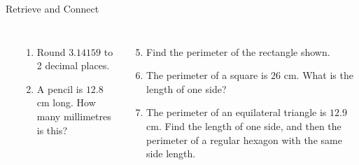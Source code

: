 \documentclass{beamer}
\newcommand{\ablank}[1]{%
  \alt<2>{\textcolor{red}{#1}}{\underline{\phantom{#1}}}%
}
\newcommand{\ashow}[1]{\uncover<2->{\textcolor{red}{\small #1}}}
\newcommand{\ashowq}[1]{\alt<2->{\textcolor{red}{\small #1}}{?}}
\begin{document}
\begin{frame}{Retrieve and Connect}
\hypertarget{q-st1}{}

\begin{columns}

\begin{center}
\end{center}

\small
\begin{enumerate}
  \item Round $3.14159$ to 2 decimal places. \ashow{3.14}
  \item A pencil is $12.8$ cm long. How many millimetres is this? \ablank{128 mm}
\end{enumerate}

\begin{enumerate}
  \setcounter{enumi}{4}
  \item Find the perimeter of the rectangle shown. \ashow{25.4 cm}
  \item The perimeter of a square is $26$ cm. What is the length of one side? \ashow{6.5 cm}
  \item  The perimeter of an equilateral triangle is $12.9$ cm. 
    Find the length of one side, and then the perimeter of a regular hexagon with the same side length. \ashow{$4.3$ cm; hexagon: $25.8$ cm}
\end{enumerate}

\end{columns}
\end{frame}
\end{document}
